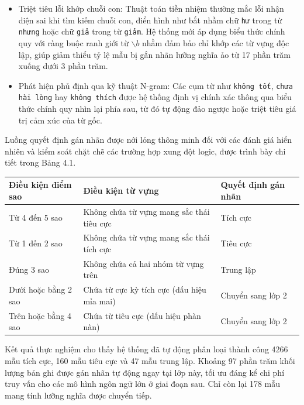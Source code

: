 \begin{itemize}[labelsep=10pt, leftmargin=2cm]
    \item Triệt tiêu lỗi khớp chuỗi con: Thuật toán tiền nhiệm thường mắc lỗi nhận diện sai khi tìm kiếm chuỗi con, điển hình như bắt nhầm chữ \texttt{hư} trong từ \texttt{nhưng} hoặc chữ \texttt{giả} trong từ \texttt{giảm}. Hệ thống mới áp dụng biểu thức chính quy với ràng buộc ranh giới từ $\backslash b$ nhằm đảm bảo chỉ khớp các từ vựng độc lập, giúp giảm thiểu tỷ lệ mẫu bị gắn nhãn lưỡng nghĩa ảo từ 17 phần trăm xuống dưới 3 phần trăm.
    \item Phát hiện phủ định qua kỹ thuật N-gram: Các cụm từ như \texttt{không tốt}, \texttt{chưa hài lòng} hay \texttt{không thích} được hệ thống định vị chính xác thông qua biểu thức chính quy nhìn lại phía sau, từ đó tự động đảo ngược hoặc triệt tiêu giá trị cảm xúc của từ gốc.
\end{itemize}

Luồng quyết định gán nhãn được nới lỏng thông minh đối với các đánh giá hiển nhiên và kiểm soát chặt chẽ các trường hợp xung đột logic, được trình bày chi tiết trong Bảng 4.1.

\begin{center}
\renewcommand{\arraystretch}{1.4}
\begin{tabularx}{\textwidth}{|l|X|l|}
\hline
\rowcolor[HTML]{E8E8E8}
\textbf{Điều kiện điểm sao} & \textbf{Điều kiện từ vựng} & \textbf{Quyết định gán nhãn} \\
\hline
Từ 4 đến 5 sao & Không chứa từ vựng mang sắc thái tiêu cực & Tích cực \\
\hline
Từ 1 đến 2 sao & Không chứa từ vựng mang sắc thái tích cực & Tiêu cực \\
\hline
Đúng 3 sao & Không chứa cả hai nhóm từ vựng trên & Trung lập \\
\hline
Dưới hoặc bằng 2 sao & Chứa từ cực kỳ tích cực (dấu hiệu mỉa mai) & Chuyển sang lớp 2 \\
\hline
Trên hoặc bằng 4 sao & Chứa từ tiêu cực (dấu hiệu phàn nàn) & Chuyển sang lớp 2 \\
\hline
\end{tabularx}
\end{center}

Kết quả thực nghiệm cho thấy hệ thống đã tự động phân loại thành công 4266 mẫu tích cực, 160 mẫu tiêu cực và 47 mẫu trung lập. Khoảng 97 phần trăm khối lượng bản ghi được gán nhãn tự động ngay tại lớp này, tối ưu đáng kể chi phí truy vấn cho các mô hình ngôn ngữ lớn ở giai đoạn sau. Chỉ còn lại 178 mẫu mang tính lưỡng nghĩa được chuyển tiếp.

